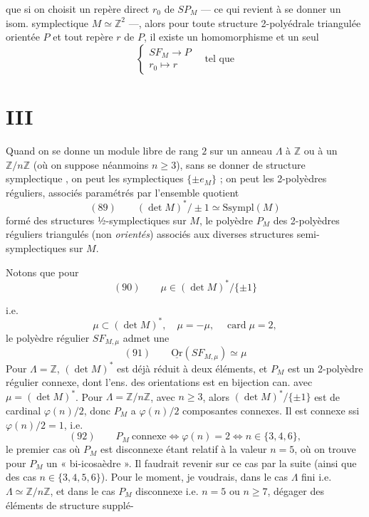 \documentclass[11pt,a4paper]{article}
\begin{document}

que si on choisit un repère direct $r_0$ \struck{\ill{}} de $SP_M$ --- ce qui revient à se donner un isom. symplectique $M \simeq \mathbb{Z}^2$ ---, alors pour toute structure 2-polyédrale triangulée orientée $P$ et tout repère $r$ de $P$, il existe un homomorphisme et un seul
\[
\begin{cases}
SF_M \longrightarrow P \\
r_0 \longmapsto r
\end{cases}
\quad \text{tel que}
\]

\section*{III}

Quand on se donne un module libre  de rang $2$  sur un anneau $\Lambda$  à $\mathbb{Z}$ ou à un $\mathbb{Z}/n\mathbb{Z}$ (où on suppose néanmoins $n \geq 3$), sans se donner de structure symplectique , on peut  les  symplectiques $\{\pm e_M\}$ ; on peut  les 2-polyèdres  réguliers, \struck{\ill{}} associés \ill{} paramétrés par l'ensemble quotient
\[
(89)\qquad (\det M)^{*}/\pm 1 \simeq \mathrm{Ssympl}(M)
\]
formé des structures ½-symplectiques sur $M$, \ill{} le polyèdre $P_M$  des 2-polyèdres réguliers triangulés (non \emph{orientés}) associés aux diverses structures semi-symplectiques sur $M$.


Notons que pour
\[
(90)\qquad \mu \in (\det M)^{*}/\{\pm 1\}
\]

i.e.
\[
\mu \subset (\det M)^{*}, \quad \mu = -\mu, \quad \operatorname{card} \mu = 2 ,
\]
le polyèdre régulier $SF_{M,\mu}$ admet une 
\[
(91)\qquad \underline{\mathrm{Or}}(SF_{M,\mu}) \simeq \mu
\]
Pour $\Lambda = \mathbb{Z}$, $(\det M)^{*}$ est déjà réduit à deux éléments, et $P_M$ est un 2-polyèdre régulier connexe, dont l'ens. des orientations est en bijection can. avec $\mu = (\det M)^{*}$. Pour $\Lambda = \mathbb{Z}/n\mathbb{Z}$, avec $n \geq 3$, alors $(\det M)^{*}/\{\pm 1\}$ est de cardinal $\varphi(n)/2$, donc $P_M$ a $\varphi(n)/2$ composantes connexes. Il est connexe ssi $\varphi(n)/2 = 1$, i.e.
\[
(92)\qquad P_M \ \text{connexe} \iff \varphi(n) = 2 \iff n \in \{3, 4, 6\} ,
\]
le premier cas où $P_M$ est disconnexe étant relatif à la valeur $n = 5$, où on trouve pour $P_M$ un « bi-icosaèdre ». Il faudrait revenir sur ce cas par la suite (ainsi que  \struck{\ill{}} des cas $n \in \{3, 4, 5, 6\}$). Pour le moment, je voudrais, dans le cas $\Lambda$ fini i.e. $\Lambda \simeq \mathbb{Z}/n\mathbb{Z}$, et dans le cas $P_M$ disconnexe i.e. $n = 5$ ou $n \geq 7$, dégager des éléments de structure supplé-
\end{document}
